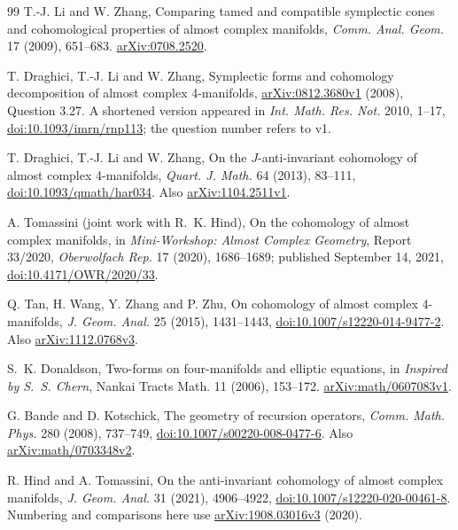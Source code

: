 \documentclass[11pt]{article}
\begin{document}
\begin{thebibliography}{99}\small
{}
T.-J. Li and W. Zhang, Comparing tamed and compatible symplectic cones and
cohomological properties of almost complex manifolds,
\emph{Comm. Anal. Geom.} 17 (2009), 651--683.
\href{https://arxiv.org/abs/0708.2520}{arXiv:0708.2520}.

T. Draghici, T.-J. Li and W. Zhang, Symplectic forms and cohomology
decomposition of almost complex 4-manifolds,
\href{https://arxiv.org/abs/0812.3680v1}{arXiv:0812.3680v1} (2008),
Question 3.27. A shortened version appeared in
\emph{Int. Math. Res. Not.} 2010, 1--17,
\href{https://doi.org/10.1093/imrn/rnp113}{doi:10.1093/imrn/rnp113};
the question number refers to v1.

T. Draghici, T.-J. Li and W. Zhang, On the $J$-anti-invariant cohomology of
almost complex 4-manifolds, \emph{Quart. J. Math.} 64 (2013), 83--111,
\href{https://doi.org/10.1093/qmath/har034}{doi:10.1093/qmath/har034}.
Also \href{https://arxiv.org/abs/1104.2511v1}{arXiv:1104.2511v1}.

A. Tomassini (joint work with R.~K. Hind), On the cohomology of almost complex
manifolds, in \emph{Mini-Workshop: Almost Complex Geometry},
Report 33/2020, \emph{Oberwolfach Rep.} 17 (2020), 1686--1689;
published September 14, 2021,
\href{https://doi.org/10.4171/OWR/2020/33}{doi:10.4171/OWR/2020/33}.

Q. Tan, H. Wang, Y. Zhang and P. Zhu, On cohomology of almost complex
4-manifolds, \emph{J. Geom. Anal.} 25 (2015), 1431--1443,
\href{https://doi.org/10.1007/s12220-014-9477-2}{doi:10.1007/s12220-014-9477-2}.
Also \href{https://arxiv.org/abs/1112.0768v3}{arXiv:1112.0768v3}.

S.~K. Donaldson, Two-forms on four-manifolds and elliptic equations, in
\emph{Inspired by S.~S. Chern}, Nankai Tracts Math. 11 (2006), 153--172.
\href{https://arxiv.org/abs/math/0607083v1}{arXiv:math/0607083v1}.

G. Bande and D. Kotschick, The geometry of recursion operators,
\emph{Comm. Math. Phys.} 280 (2008), 737--749,
\href{https://doi.org/10.1007/s00220-008-0477-6}{doi:10.1007/s00220-008-0477-6}.
Also \href{https://arxiv.org/abs/math/0703348v2}{arXiv:math/0703348v2}.

R. Hind and A. Tomassini, On the anti-invariant cohomology of almost complex
manifolds, \emph{J. Geom. Anal.} 31 (2021), 4906--4922,
\href{https://doi.org/10.1007/s12220-020-00461-8}{doi:10.1007/s12220-020-00461-8}.
Numbering and comparisons here use
\href{https://arxiv.org/abs/1908.03016v3}{arXiv:1908.03016v3} (2020).


\end{thebibliography}
\end{document}

